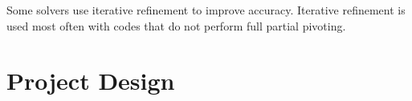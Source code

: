\documentclass[acmtocl]{acmtrans2m}
\begin{document}
Some solvers use iterative refinement to improve accuracy.  Iterative
refinement is used most often with codes that do not perform full partial pivoting.  

%

\section{Project Design}
\label{sec:design}
\end{document}
